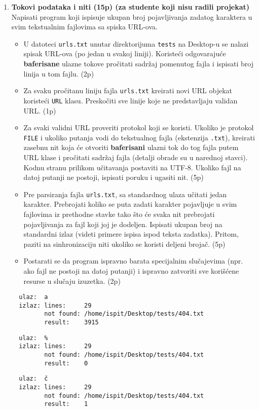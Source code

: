 \documentclass[]{article}
\begin{document}
\begin{enumerate}
 \item \textbf{Tokovi podataka i niti (15p) (za studente koji nisu radili projekat)}
  \\Napisati program koji ispisuje ukupan broj pojavljivanja zadatog karaktera u svim tekstualnim fajlovima sa spiska URL-ova. 
  \begin{itemize}
    \item U datoteci \texttt{urls.txt} unutar direktorijuma \texttt{tests} na Desktop-u se nalazi spisak URL-ova (po jedan u svakoj liniji). Koriste\'c{}i odgovaraju\'c{}e \textbf{baferisane} ulazne tokove pro\v{c}itati sadr\v{z}aj pomenutog fajla i ispisati broj linija u tom fajlu. \hfill (2p)
    \item Za svaku pro\v{c}itanu liniju fajla \texttt{urls.txt} kreirati novi URL objekat koriste\'c{}i \texttt{URL} klasu. Presko\v{c}iti sve linije koje ne predstavljaju validan URL. \hfill (1p)
    \item Za svaki validni URL proveriti protokol koji se koristi. Ukoliko je protokol \texttt{FILE} i ukoliko putanja vodi do tekstualnog fajla (ekstenzija \texttt{.txt}), kreirati zasebnu nit koja \'c{}e otvoriti \textbf{baferisani} ulazni tok do tog fajla putem URL klase i pro\v{c}itati sadr\v{z}aj fajla (detalji obrade su u narednoj stavci). Kodnu stranu prilikom u\v{c}itavanja postaviti na UTF-8. Ukoliko fajl na datoj putanji ne postoji, ispisati poruku i ugasiti nit. \hfill (5p)
    \item Pre parsiranja fajla \texttt{urls.txt}, sa standardnog ulaza u\v{c}itati jedan karakter. Prebrojati koliko se puta zadati karakter pojavljuje u svim fajlovima iz prethodne stavke tako \v{s}to \'c{}e svaka nit prebrojati pojavljivanja za fajl koji joj je dodeljen. Ispisati ukupan broj na standardni izlaz (videti primere ispisa ispod teksta zadatka). Pritom, paziti na sinhronizaciju niti ukoliko se koristi deljeni broja\v{c}. \hfill (5p)
    \item Postarati se da program ispravno barata specijalnim slu\v{c}ajevima (npr. ako fajl ne postoji na datoj putanji) i ispravno zatvoriti sve kori\v{s}\'c{}ene resurse u slu\v{c}aju izuzetka. \hfill (2p)
  \end{itemize}

  \noindent
  \begin{lstlisting}
  ulaz:  a
  izlaz: lines:     29
         not found: /home/ispit/Desktop/tests/404.txt
         result:    3915
  \end{lstlisting}
  \begin{lstlisting}
  ulaz:  %
  izlaz: lines:     29
         not found: /home/ispit/Desktop/tests/404.txt
         result:    0
  \end{lstlisting}
  \begin{lstlisting}
  ulaz:  č
  izlaz: lines:     29
         not found: /home/ispit/Desktop/tests/404.txt
         result:    1
  \end{lstlisting}

\end{enumerate}
\end{document}
